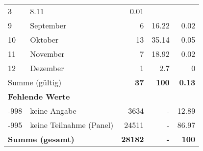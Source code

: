 \begin{longtable}{lXrrr}
       \num{3} &
       \num[round-mode=places,round-precision=2]{8,11} &
         \num[round-mode=places,round-precision=2]{0,01} \\

     9 &
     \multicolumn{1}{X}{ September   } &


       \num{6} &
       \num[round-mode=places,round-precision=2]{16,22} &
         \num[round-mode=places,round-precision=2]{0,02} \\

     10 &
     \multicolumn{1}{X}{ Oktober   } &


       \num{13} &
       \num[round-mode=places,round-precision=2]{35,14} &
         \num[round-mode=places,round-precision=2]{0,05} \\

     11 &
     \multicolumn{1}{X}{ November   } &


       \num{7} &
       \num[round-mode=places,round-precision=2]{18,92} &
         \num[round-mode=places,round-precision=2]{0,02} \\

     12 &
     \multicolumn{1}{X}{ Dezember   } &


       \num{1} &
       \num[round-mode=places,round-precision=2]{2,7} &
         \num[round-mode=places,round-precision=2]{0} \\
     \midrule
     \multicolumn{2}{l}{Summe (gültig)} &
       \textbf{\num{37}} &
     \textbf{100} &
       \textbf{\num[round-mode=places,round-precision=2]{0,13}} \\
     \multicolumn{5}{l}{\textbf{Fehlende Werte}}\\
       -998 &
       keine Angabe &
         \num{3634} &
        - &
         \num[round-mode=places,round-precision=2]{12,89} \\
       -995 &
       keine Teilnahme (Panel) &
         \num{24511} &
        - &
         \num[round-mode=places,round-precision=2]{86,97} \\
     \midrule
     \multicolumn{2}{l}{\textbf{Summe (gesamt)}} &
          \textbf{\num{28182}} &
        \textbf{-} &
        \textbf{100} \\
     \bottomrule
     \end{longtable}
     
